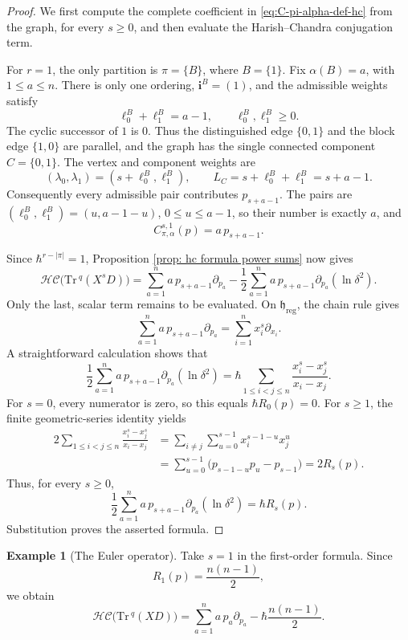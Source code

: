 \documentclass[11pt,reqno]{amsart}
\theoremstyle{definition}
\newtheorem{example}[theorem]{Example}
\newcommand{\Tr}{\mathrm{Tr} \,}
\newcommand{\fkh}{\mathfrak{h}}
\newcommand{\hc}{\mathcal{HC}}
\newcommand{\reg}{\mathrm{reg}}
\newcommand{\bfi}{\mathbf{i}}
\begin{document}
\begin{proof}
We first compute the complete coefficient in
\eqref{eq:C-pi-alpha-def-hc} from the graph, for every
\(s\geq0\), and then evaluate the Harish--Chandra conjugation term.

For \(r=1\), the only partition is \(\pi=\{B\}\), where
\(B=\{1\}\). Fix \(\alpha(B)=a\), with \(1\leq a\leq n\).
There is only one ordering, \(\bfi^B=(1)\), and the admissible
weights satisfy
\[
\ell_0^B+\ell_1^B=a-1,
\qquad \ell_0^B,\ell_1^B\geq0.
\]
The cyclic successor of \(1\) is \(0\). Thus the distinguished
edge \(\{0,1\}\) and the block edge \(\{1,0\}\) are parallel,
and the graph has the single connected component \(C=\{0,1\}\).
The vertex and component weights are
\[
(\lambda_0,\lambda_1)=(s+\ell_0^B,\ell_1^B),
\qquad L_C=s+\ell_0^B+\ell_1^B=s+a-1.
\]
Consequently every admissible pair contributes \(p_{s+a-1}\).
The pairs are \((\ell_0^B,\ell_1^B)=(u,a-1-u)\),
\(0\leq u\leq a-1\), so their number is exactly \(a\), and
\[
C_{\pi,\alpha}^{s,1}(p)=a\,p_{s+a-1}.
\]


Since \(\hbar^{r-|\pi|}=1\), Proposition
\ref{prop: hc formula power sums} now gives
\[
\hc\bigl(\Tr^q(X^sD)\bigr)
=\sum_{a=1}^n a\,p_{s+a-1}\partial_{p_a}
-\frac12\sum_{a=1}^n a\,p_{s+a-1}
\partial_{p_a}(\ln\delta^2).
\]
Only the last, scalar term remains to be evaluated. On
\(\fkh_{\reg}\), the chain rule gives
\[
\sum_{a=1}^n a\,p_{s+a-1}\partial_{p_a}
=\sum_{i=1}^n x_i^s\partial_{x_i}.
\]
A straightforward calculation shows that
\[
\frac12\sum_{a=1}^n a\,p_{s+a-1}
\partial_{p_a}(\ln\delta^2)
=\hbar\sum_{1\leq i<j\leq n}
\frac{x_i^s-x_j^s}{x_i-x_j}.
\]
For \(s=0\), every numerator is zero, so this equals
\(\hbar R_0(p)=0\). For \(s\geq1\), the finite geometric-series
identity yields
\[
\begin{aligned}
2\sum_{1\leq i<j\leq n}\frac{x_i^s-x_j^s}{x_i-x_j}
&=\sum_{i\neq j}\sum_{u=0}^{s-1}x_i^{s-1-u}x_j^u\\
&=\sum_{u=0}^{s-1}
\bigl(p_{s-1-u}p_u-p_{s-1}\bigr)
=2R_s(p).
\end{aligned}
\]
Thus, for every \(s\geq0\),
\[
\frac12\sum_{a=1}^n a\,p_{s+a-1}
\partial_{p_a}(\ln\delta^2)=\hbar R_s(p).
\]
Substitution proves the asserted formula.
\end{proof}



\begin{example}[The Euler operator]
Take \(s=1\) in the first-order formula.  Since
\[
	R_1(p)=\frac{n(n-1)}2,
\]
we obtain
\[
	\hc\bigl(\Tr^q(XD)\bigr)
	=
	\sum_{a=1}^n a\,p_a\partial_{p_a}
	-
	\hbar\frac{n(n-1)}2.
\]

\end{example}
\end{document}
